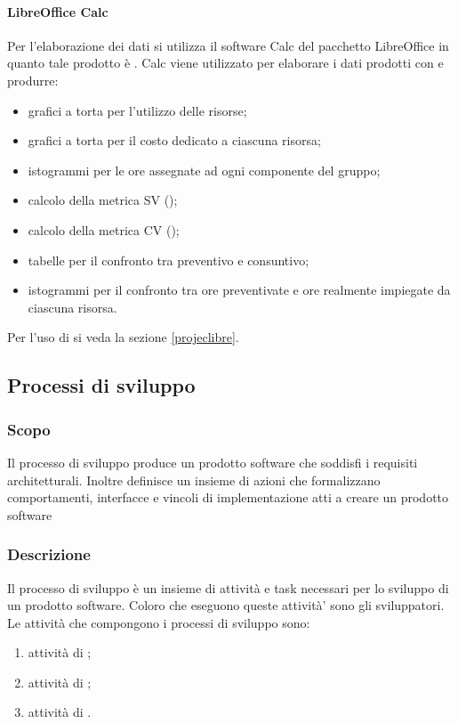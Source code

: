 \documentclass[12pt,a4paper]{article}
\begin{document}

\paragraph{LibreOffice Calc}
Per l’elaborazione dei dati si utilizza il software Calc del pacchetto LibreOffice in quanto tale prodotto è . Calc viene utilizzato per elaborare i dati prodotti con  e produrre:
\begin{itemize}
	\item grafici a torta per l’utilizzo delle risorse;
	\item grafici a torta per il costo dedicato a ciascuna risorsa;
	\item istogrammi per le ore assegnate ad ogni componente del gruppo;
	\item calcolo della metrica SV ();
	\item calcolo della metrica CV ();
	\item tabelle per il confronto tra preventivo e consuntivo;
	\item istogrammi per il confronto tra ore preventivate e ore realmente impiegate da
	ciascuna risorsa.
\end{itemize}

Per l'uso di  si veda la sezione \ref{projeclibre}.

\subsection{Processi di sviluppo}

\subsubsection{Scopo}
Il processo di sviluppo produce un prodotto software che soddisfi i requisiti architetturali. Inoltre definisce un insieme di azioni che formalizzano comportamenti, interfacce e vincoli di implementazione atti a creare un prodotto software

\subsubsection{Descrizione}
Il processo di sviluppo è un insieme di attività e task necessari per lo sviluppo di un prodotto software. Coloro che eseguono queste attività' sono gli sviluppatori. Le attività che compongono i processi di sviluppo sono:
\begin{enumerate}
	\item attività di \FA;
	\item attività di \FPA;
	\item attività di \FPDC.
\end{enumerate}
\end{document}
